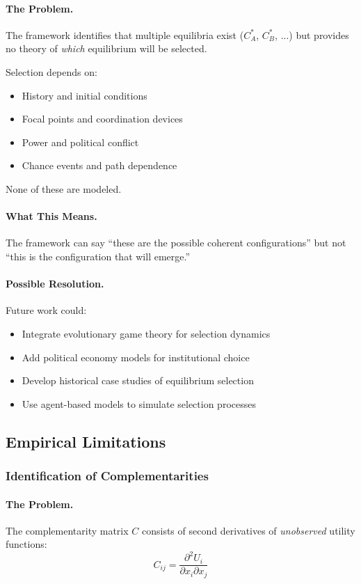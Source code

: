 \paragraph{The Problem.}
The framework identifies that multiple equilibria exist ($C^*_A$, $C^*_B$, ...)
but provides no theory of \emph{which} equilibrium will be selected.

Selection depends on:
\begin{itemize}
  \item History and initial conditions
  \item Focal points and coordination devices
  \item Power and political conflict
  \item Chance events and path dependence
\end{itemize}

None of these are modeled.

\paragraph{What This Means.}
The framework can say ``these are the possible coherent configurations''
but not ``this is the configuration that will emerge.''

\paragraph{Possible Resolution.}
Future work could:
\begin{itemize}
  \item Integrate evolutionary game theory for selection dynamics
  \item Add political economy models for institutional choice
  \item Develop historical case studies of equilibrium selection
  \item Use agent-based models to simulate selection processes
\end{itemize}

\subsection{Empirical Limitations}

\subsubsection{Identification of Complementarities}

\paragraph{The Problem.}
The complementarity matrix $C$ consists of second derivatives of \emph{unobserved}
utility functions:
\begin{equation}
  C_{ij} = \frac{\partial^2 U_i}{\partial x_i \partial x_j}
\end{equation}

